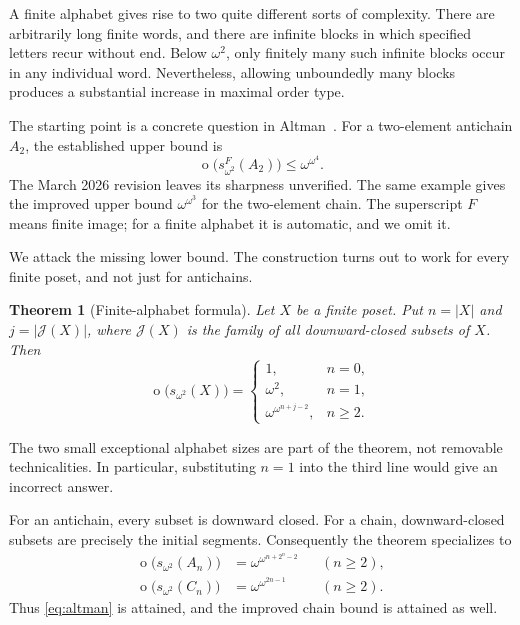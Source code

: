 \documentclass[11pt]{article}
\numberwithin{equation}{section}
\newtheorem{theorem}{Theorem}[section]
\theoremstyle{plain}
\theoremstyle{definition}
\theoremstyle{remark}
\newcommand{\ot}{\operatorname{o}}
\newcommand{\J}{\mathcal J}
\begin{document}
A finite alphabet gives rise to two quite different sorts of complexity. There are arbitrarily long finite words, and there are infinite blocks in which specified letters recur without end. Below $\omega^2$, only finitely many such infinite blocks occur in any individual word. Nevertheless, allowing unboundedly many blocks produces a substantial increase in maximal order type.

The starting point is a concrete question in Altman~\cite[Example~3.15]{Altman}. For a two-element antichain $A_2$, the established upper bound is
\begin{equation}\label{eq:altman}
 \ot\bigl(s^F_{\omega^2}(A_2)\bigr)\leq\omega^{\omega^4}.
\end{equation}
The March 2026 revision leaves its sharpness unverified. The same example gives the improved upper bound $\omega^{\omega^3}$ for the two-element chain. The superscript $F$ means finite image; for a finite alphabet it is automatic, and we omit it.

We attack the missing lower bound. The construction turns out to work for every finite poset, and not just for antichains.

\begin{theorem}[Finite-alphabet formula]\label{thm:main}
Let $X$ be a finite poset. Put $n=|X|$ and $j=|\J(X)|$, where $\J(X)$ is the family of all downward-closed subsets of $X$. Then
\begin{equation}\label{eq:main}
 \ot\bigl(s_{\omega^2}(X)\bigr)=
 \begin{cases}
  1,&n=0,\\
  \omega^2,&n=1,\\
  \omega^{\omega^{n+j-2}},&n\geq2.
 \end{cases}
\end{equation}
\end{theorem}

The two small exceptional alphabet sizes are part of the theorem, not removable technicalities. In particular, substituting $n=1$ into the third line would give an incorrect answer.

For an antichain, every subset is downward closed. For a chain, downward-closed subsets are precisely the initial segments. Consequently the theorem specializes to
\begin{align}
 \ot\bigl(s_{\omega^2}(A_n)\bigr)
   &=\omega^{\omega^{n+2^n-2}} &&(n\geq2),\label{eq:anti}\\
 \ot\bigl(s_{\omega^2}(C_n)\bigr)
   &=\omega^{\omega^{2n-1}} &&(n\geq2).\label{eq:chain}
\end{align}
Thus \eqref{eq:altman} is attained, and the improved chain bound is attained as well.
\end{document}
